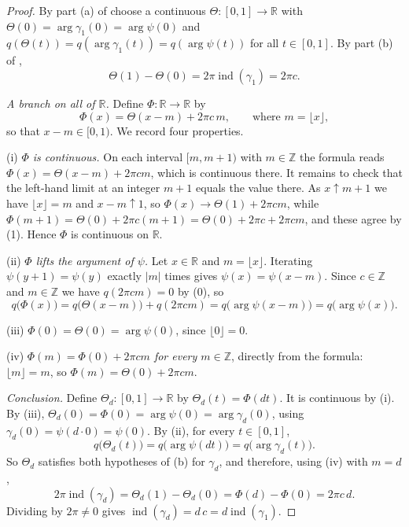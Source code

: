 \begin{proof}
By part (a) of  choose a continuous
$\Theta\colon[0,1]\to\mathbb{R}$ with $\Theta(0)=\arg\gamma_1(0)=\arg\psi(0)$ and
$q(\Theta(t))=q(\arg\gamma_1(t))=q(\arg\psi(t))$ for all $t\in[0,1]$.  By part
(b) of ,
\begin{equation}\tag{1}
  \Theta(1)-\Theta(0)=2\pi\operatorname{ind}(\gamma_1)=2\pi c .
\end{equation}

\emph{A branch on all of $\mathbb{R}$.}  Define $\Phi\colon\mathbb{R}\to\mathbb{R}$
by
\[
  \Phi(x)=\Theta(x-m)+2\pi c\,m,\qquad\text{where }m=\lfloor x\rfloor,
\]
so that $x-m\in[0,1)$.  We record four properties.

(i) \emph{$\Phi$ is continuous.}  On each interval $[m,m+1)$ with
$m\in\mathbb{Z}$ the formula reads $\Phi(x)=\Theta(x-m)+2\pi cm$, which is
continuous there.  It remains to check that the left-hand limit at an integer
$m+1$ equals the value there.  As $x\uparrow m+1$ we have
$\lfloor x\rfloor=m$ and $x-m\uparrow1$, so
$\Phi(x)\to\Theta(1)+2\pi cm$, while
$\Phi(m+1)=\Theta(0)+2\pi c(m+1)=\Theta(0)+2\pi c+2\pi cm$, and these agree by
(1).  Hence $\Phi$ is continuous on $\mathbb{R}$.

(ii) \emph{$\Phi$ lifts the argument of $\psi$.}  Let $x\in\mathbb{R}$ and
$m=\lfloor x\rfloor$.  Iterating $\psi(y+1)=\psi(y)$ exactly $|m|$ times gives
$\psi(x)=\psi(x-m)$.  Since $c\in\mathbb{Z}$ and $m\in\mathbb{Z}$ we have
$q(2\pi cm)=0$ by (0), so
\[
  q\bigl(\Phi(x)\bigr)=q\bigl(\Theta(x-m)\bigr)+q(2\pi cm)
  =q\bigl(\arg\psi(x-m)\bigr)=q\bigl(\arg\psi(x)\bigr).
\]

(iii) \emph{$\Phi(0)=\Theta(0)=\arg\psi(0)$}, since $\lfloor0\rfloor=0$.

(iv) \emph{$\Phi(m)=\Phi(0)+2\pi cm$ for every $m\in\mathbb{Z}$}, directly from
the formula: $\lfloor m\rfloor=m$, so $\Phi(m)=\Theta(0)+2\pi cm$.

\emph{Conclusion.}  Define $\Theta_d\colon[0,1]\to\mathbb{R}$ by
$\Theta_d(t)=\Phi(dt)$.  It is continuous by (i).  By (iii),
$\Theta_d(0)=\Phi(0)=\arg\psi(0)=\arg\gamma_d(0)$, using
$\gamma_d(0)=\psi(d\cdot0)=\psi(0)$.  By (ii), for every $t\in[0,1]$,
\[
  q\bigl(\Theta_d(t)\bigr)=q\bigl(\arg\psi(dt)\bigr)=q\bigl(\arg\gamma_d(t)\bigr).
\]
So $\Theta_d$ satisfies both hypotheses of (b) for
$\gamma_d$, and therefore, using (iv) with $m=d$,
\[
  2\pi\operatorname{ind}(\gamma_d)=\Theta_d(1)-\Theta_d(0)=\Phi(d)-\Phi(0)=2\pi c\,d .
\]
Dividing by $2\pi\neq0$ gives
$\operatorname{ind}(\gamma_d)=d\,c=d\operatorname{ind}(\gamma_1)$.
\end{proof}
